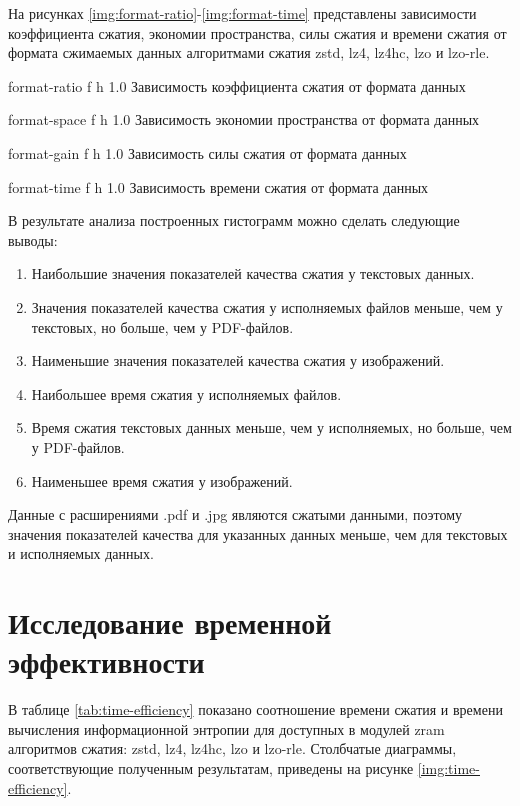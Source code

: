 На рисунках \ref{img:format-ratio}-\ref{img:format-time} представлены зависимости коэффициента сжатия, экономии пространства, силы сжатия и времени сжатия от формата сжимаемых данных алгоритмами сжатия zstd, lz4, lz4hc, lzo и lzo-rle.

    {format-ratio}
    {f}
    {h}
    {1.0\textwidth}
    {Зависимость коэффициента сжатия от формата данных}

    {format-space}
    {f}
    {h}
    {1.0\textwidth}
    {Зависимость экономии пространства от формата данных}

    {format-gain}
    {f}
    {h}
    {1.0\textwidth}
    {Зависимость силы сжатия от формата данных}

    {format-time}
    {f}
    {h}
    {1.0\textwidth}
    {Зависимость времени сжатия от формата данных}

В результате анализа построенных гистограмм можно сделать следующие выводы:

\begin{enumerate}
    \item Наибольшие значения показателей качества сжатия у текстовых данных.
    \item Значения показателей качества сжатия у исполняемых файлов меньше, чем у текстовых, но больше, чем у PDF-файлов.
    \item Наименьшие значения показателей качества сжатия у изображений.
    \item Наибольшее время сжатия у исполняемых файлов.
    \item Время сжатия текстовых данных меньше, чем у исполняемых, но больше, чем у PDF-файлов.
    \item Наименьшее время сжатия у изображений.
\end{enumerate}

Данные с расширениями .pdf и .jpg являются сжатыми данными, поэтому значения показателей качества для указанных данных меньше, чем для текстовых и исполняемых данных.

\section{Исследование временной эффективности}

В таблице \ref{tab:time-efficiency} показано соотношение времени сжатия и времени вычисления информационной энтропии для доступных в модулей zram алгоритмов сжатия: zstd, lz4, lz4hc, lzo и lzo-rle. Столбчатые диаграммы, соответствующие полученным результатам, приведены на рисунке \ref{img:time-efficiency}.

